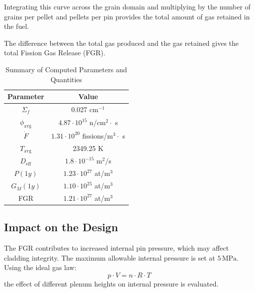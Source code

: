 Integrating this curve across the grain domain and multiplying by the number of grains per pellet and pellets per pin provides the total amount of gas retained in the fuel.

The difference between the total gas produced and the gas retained gives the total Fission Gas Release (FGR).

\begin{table}[H]
    \centering
    \caption{Summary of Computed Parameters and Quantities}
    \begin{tabular}{|c|c|}
        \hline
        \textbf{Parameter} & \textbf{Value} \\
        \hline
        $\Sigma_f$ & 0.027 cm$^{-1}$ \\
        $\phi_{\text{avg}}$ & $4.87 \cdot 10^{15}$ n/cm$^2 \cdot$ s \\
        $\dot{F}$ & $1.31 \cdot 10^{20}$ fissions/m$^3 \cdot$ s \\
        $T_{\text{avg}}$ & 2349.25 K \\
        $D_{\text{eff}}$ & $1.8 \cdot 10^{-15}$ m$^2$/s \\
        $P(1y)$ & $1.23 \cdot 10^{27}$ at/m$^3$ \\
        $G_M(1y)$ & $1.10 \cdot 10^{25}$ at/m$^3$ \\
        FGR & $1.21 \cdot 10^{27}$ at/m$^3$ \\
        \hline
    \end{tabular}
    \label{tab:fgr_summary}
\end{table}

\subsection{Impact on the Design}

The FGR contributes to increased internal pin pressure, which may affect cladding integrity. The maximum allowable internal pressure is set at $5 \, \text{MPa}$. Using the ideal gas law:
\begin{equation}
    p \cdot V = n \cdot R \cdot T
\end{equation}
the effect of different plenum heights on internal pressure is evaluated.

